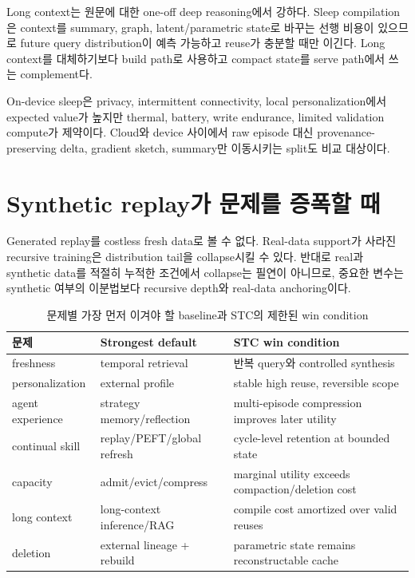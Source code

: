 Long context는 원문에 대한 one-off deep reasoning에서 강하다. Sleep compilation은 context를 summary,
graph, latent/parametric state로 바꾸는 선행 비용이 있으므로 future query distribution이 예측 가능하고
reuse가 충분할 때만 이긴다. Long context를 대체하기보다 build path로 사용하고 compact state를 serve
path에서 쓰는 complement다.

On-device sleep은 privacy, intermittent connectivity, local personalization에서 expected value가 높지만
thermal, battery, write endurance, limited validation compute가 제약이다. Cloud와 device 사이에서 raw
episode 대신 provenance-preserving delta, gradient sketch, summary만 이동시키는 split도 비교 대상이다.

\section{Synthetic replay가 문제를 증폭할 때}

Generated replay를 costless fresh data로 볼 수 없다. Real-data support가 사라진 recursive training은
distribution tail을 collapse시킬 수 있다. \parencite{srcstc0041} 반대로 real과 synthetic
data를 적절히 누적한 조건에서 collapse는 필연이 아니므로, 중요한 변수는 synthetic 여부의 이분법보다
recursive depth와 real-data anchoring이다. \parencite{srcstc0069}

\begin{table}[htbp]
\centering
\caption{문제별 가장 먼저 이겨야 할 baseline과 STC의 제한된 win condition}
\label{tab:problem-baselines-short}
\small
\begin{tabularx}{\textwidth}{p{} p{} X}
\toprule
문제 & Strongest default & STC win condition \\
\midrule
freshness & temporal retrieval & 반복 query와 controlled synthesis \\
personalization & external profile & stable high reuse, reversible scope \\
agent experience & strategy memory/reflection & multi-episode compression improves later utility \\
continual skill & replay/PEFT/global refresh & cycle-level retention at bounded state \\
capacity & admit/evict/compress & marginal utility exceeds compaction/deletion cost \\
long context & long-context inference/RAG & compile cost amortized over valid reuses \\
deletion & external lineage + rebuild & parametric state remains reconstructable cache \\
\bottomrule
\end{tabularx}
\end{table}
